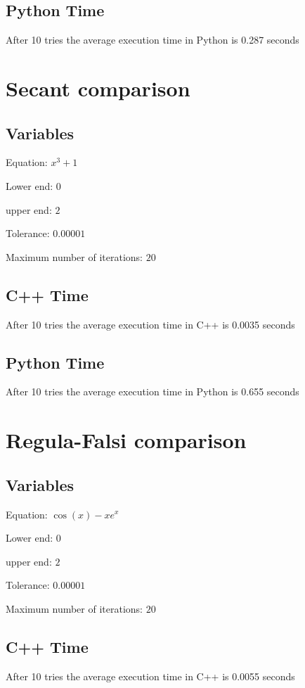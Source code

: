 \documentclass[conference]{IEEEtran}
\begin{document}
\subsection{Python Time}
After 10 tries the average execution time in Python is 0.287 seconds


\section{Secant comparison}
\subsection{Variables}

Equation: \(x^3 + 1\) 

Lower end: \(0\)

upper end: \(2\)

Tolerance: \(0.00001\) 

Maximum number of iterations: \(20\)

\subsection{C++ Time} 
After 10 tries the average execution time in C++ is 0.0035 seconds

\subsection{Python Time}
After 10 tries the average execution time in Python is 0.655 seconds

\section{Regula-Falsi comparison}
\subsection{Variables}

Equation: \( \cos(x) - x e^x \) 

Lower end: \(0\)

upper end: \(2\)

Tolerance: \(0.00001\) 

Maximum number of iterations: \(20\)

\subsection{C++ Time}
After 10 tries the average execution time in C++ is 0.0055 seconds
\end{document}

